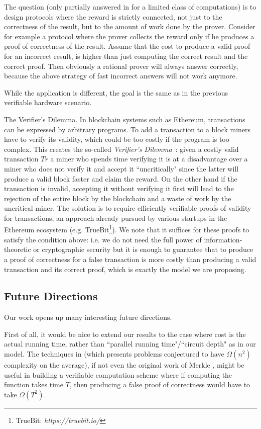 The question (only partially answered in \cite{cg15,cg17} for a limited class of computations) is to design protocols where the reward is strictly connected, not just to the correctness of the result, but to the amount of work done by the prover. Consider for example a protocol where the prover collects the reward only if he produces a proof of correctness of the result. Assume that the cost to  produce a valid proof for an incorrect result, is higher than just computing the correct result and the correct proof. Then obviously a rational prover will always answer correctly, because the above strategy of fast incorrect answers will not work anymore. 

While the application is different, the goal is the same as in the previous verifiable hardware scenario. 

\medskip
\noindent
{\sc The Verifier's Dilemma.}
In blockchain systems such as Ethereum, transactions can be expressed by arbitrary programs. To add a transaction to a block miners have to verify its validity, which could be too costly if the program is too complex. This creates the so-called {\em Verifier's Dilemma}~\cite{luu2015demystifying}: given a costly valid transaction $Tr$ a miner who spends time verifying it is at a disadvantage over a miner who does not verify it and accept it ``uncritically" since the latter will produce a valid block faster and claim the reward. On the other hand if the transaction is invalid, accepting it without verifying it first will lead to the rejection of the entire block by the blockchain and a waste of work by the uncritical miner.
The solution is to require efficiently verifiable proofs of validity for transactions, an approach already pursued by various startups in the Ethereum ecosystem (e.g. TrueBit\footnote{TrueBit: \textit{https://truebit.io/}}). We note that it suffices for these proofs to satisfy the condition above: i.e. we do not need the full power of information-theoretic or cryptographic security but it is enough to guarantee that to produce a proof of correctness for a false transaction is more costly than producing a valid transaction and its correct proof, which is exactly the model we are proposing. 


\subsection{Future Directions}

Our work opens up many interesting future directions. 

First of all, it would be nice to extend our results to the case where cost is the actual running time, rather than ``parallel running time"/``circuit depth" as in our model. The techniques in \cite{fghardness} (which presents problems conjectured to have $\Omega(n^2)$ complexity on the average), if not even the original work of Merkle \cite{merkle}, might be useful in building a verifiable computation scheme where if computing the function takes time $T$, then producing a false proof of correctness would have to take $\Omega(T^2)$. 

